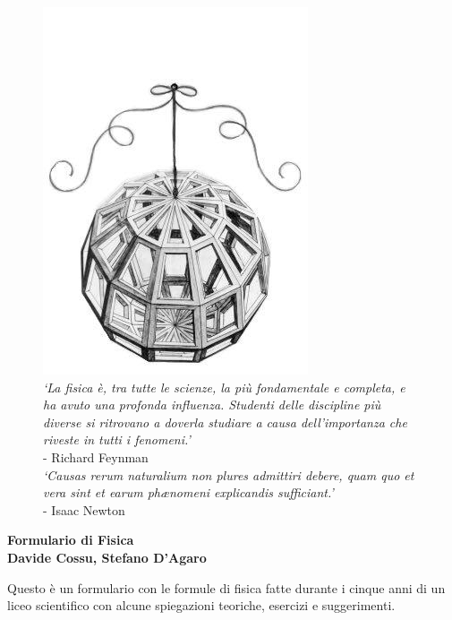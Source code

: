 \documentclass[8pt, a4paper, twocolumn, twoside]{extarticle}
\begin{document}
\thispagestyle{firststyle}
\onecolumn
\begin{@twocolumnfalse}
  \clearpage
  \begin{center}
    \begin{figure}[!h]
      \centering
      \captionsetup{justification=centering}
      \includegraphics[scale=3]{colophon/daVinci}
      \caption{\textit{`La fisica è, tra tutte le scienze, la più fondamentale e completa,
          e ha avuto una profonda influenza. Studenti delle discipline più diverse si 
          ritrovano a doverla studiare a causa dell'importanza che riveste in tutti i 
        fenomeni.'}\\- Richard Feynman\\ [\baselineskip]
        \textit{`Causas rerum naturalium non plures admittiri debere, quam quo et vera 
      sint et earum ph\ae nomeni explicandis sufficiant.'}\\- Isaac Newton}
      \label{fig:deer}
    \end{figure}
    \vspace{1cm}
    \begin{minipage}{.6\textwidth}				
      \begin{center}
        {\Huge\textbf{Formulario di Fisica}}\\\vspace{0.2cm}
        {\textbf{Davide Cossu, Stefano D'Agaro}}
      \end{center}
      \vspace{0.5cm}
      Questo è un formulario con le formule di fisica fatte durante i cinque anni 
      di un liceo scientifico con alcune spiegazioni teoriche, esercizi e suggerimenti.
    \end{minipage}
  \end{center}
  \clearpage
\end{@twocolumnfalse}
\end{document}
